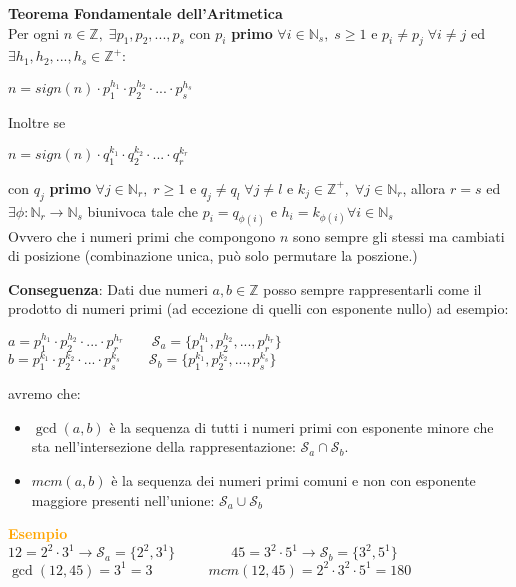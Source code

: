 \newpage
\begin{flushleft}
    \textbf{Teorema Fondamentale dell'Aritmetica} \\
    Per ogni $n \in \mathbb{Z}, \; \exists p_1, p_2, ..., p_s$ con $p_i$ \textbf{primo} $\forall i \in \mathbb{N}_s, \; s \geq 1$ e $p_i \neq p_j \; \forall i \neq j$ ed $\exists h_1, h_2, ..., h_s \in \mathbb{Z}^+$:

    {\centering
        $n = sign(n) \cdot p_1^{h_1} \cdot p_2^{h_2} \cdot ... \cdot p_s^{h_s}$
    \par}
    Inoltre se 

    {\centering
        $n = sign(n) \cdot q_1^{k_1} \cdot q_2^{k_2} \cdot ... \cdot q_r^{k_r}$
    \par}
    con $q_j$ \textbf{primo} $\forall j \in \mathbb{N}_r, \; r \geq 1$ e $q_j \neq q_l \; \forall j \neq l$ e $k_j \in \mathbb{Z}^+, \; \forall j \in \mathbb{N}_r$, allora $r = s$ ed $\exists \phi : \mathbb{N}_r \rightarrow \mathbb{N}_s$ biunivoca tale che $p_i = q_{\phi(i)}$ e $h_i = k_{\phi(i)} \forall i \in \mathbb{N}_s$ \\
    Ovvero che i numeri primi che compongono $n$ sono sempre gli stessi ma cambiati di posizione (combinazione unica, può solo permutare la poszione.) \newline

    \textbf{Conseguenza}: Dati due numeri $a, b \in \mathbb{Z}$ posso sempre rappresentarli come il prodotto di numeri primi (ad eccezione di quelli con esponente nullo) ad esempio:

    {\centering
        $a = p_1^{h_1} \cdot p_2^{h_2} \cdot ... \cdot p_r^{h_r} \qquad \mathcal{S}_a = \{p_1^{h_1}, p_2^{h_2}, ..., p_r^{h_r}\}$ \\
        $b = p_1^{k_1} \cdot p_2^{k_2} \cdot ... \cdot p_s^{k_s} \qquad \mathcal{S}_b = \{p_1^{k_1}, p_2^{k_2}, ..., p_s^{k_s}\}$
    \par}
    avremo che:
    \begin{itemize}[nosep]
        \item $\gcd (a, b)$ è la sequenza di tutti i numeri primi con esponente minore che sta nell'intersezione della rappresentazione: $\mathcal{S}_a \cap \mathcal{S}_b$.
        \item $mcm(a, b)$ è la sequenza dei numeri primi comuni e non con esponente maggiore presenti nell'unione: $\mathcal{S}_a \cup \mathcal{S}_b$
    \end{itemize}

    \begin{boxA}
        \textcolor{orange}{\textbf{Esempio}} \\
        $12 = 2^2 \cdot 3^1 \rightarrow \mathcal{S}_a = \{2^2, 3^1\} \qquad \qquad 45 = 3^2 \cdot 5^1 \rightarrow \mathcal{S}_b = \{3^2, 5^1\}$ \\
        $\gcd (12, 45) = 3^1 = 3 \qquad \qquad mcm(12, 45) = 2^2 \cdot 3^2 \cdot 5^1 = 180$
    \end{boxA}
\end{flushleft}

